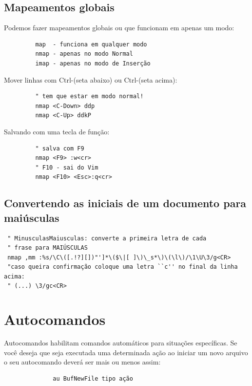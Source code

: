 \documentclass[10pt,a4paper,openany]{book}
\begin{document}
\subsection{Mapeamentos globais}


Podemos fazer mapeamentos globais ou que funcionam em apenas um modo:

\begin{verbatim}
		 map  - funciona em qualquer modo
		 nmap - apenas no modo Normal
		 imap - apenas no modo de Inserção
\end{verbatim}

Mover linhas com Ctrl-(seta abaixo) ou Ctrl-(seta acima):

\begin{verbatim}
		 " tem que estar em modo normal!
		 nmap <C-Down> ddp
		 nmap <C-Up> ddkP
\end{verbatim}

Salvando com uma tecla de função:

\begin{verbatim}
		 " salva com F9
		 nmap <F9> :w<cr>
		 " F10 - sai do Vim
		 nmap <F10> <Esc>:q<cr>
\end{verbatim}

\subsection{Convertendo as iniciais de um documento para maiúsculas}
\label{Convertendo as iniciais de um documento para maiúsculas}

\begin{verbatim}
 " MinusculasMaiusculas: converte a primeira letra de cada
 " frase para MAIÚSCULAS
 nmap ,mm :%s/\C\([.!?][])"']*\($\|[ ]\)\_s*\)\(\l\)/\1\U\3/g<CR>
 "caso queira confirmação coloque uma letra ``c'' no final da linha acima:
 " (...) \3/gc<CR>
\end{verbatim}

\section{Autocomandos }\label{Autocomandos }

Autocomandos habilitam comandos automáticos para situações
específicas. Se você deseja que seja executada uma determinada ação ao
iniciar um novo arquivo o seu autocomando deverá ser mais ou menos
assim:

\begin{verbatim}
			  au BufNewFile tipo ação
\end{verbatim}
\end{document}

